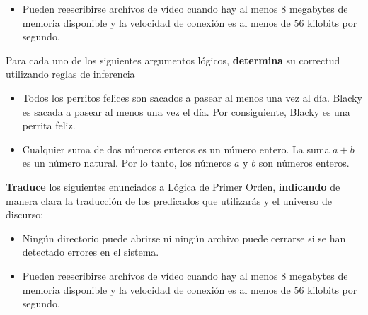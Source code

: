 \documentclass[oneside]{style}
\begin{document}
\begin{questions}[label=\protect\circled{\bfseries\arabic*}]
{\begin{itemize}
            \item Pueden reescribirse archívos de vídeo cuando hay al menos 
            $8$ megabytes de memoria disponible y la velocidad de conexión 
            es al menos de $56$ kilobits por segundo. 
         \end{itemize}
     }

    \question
    {
        Para cada uno de los siguientes argumentos lógicos, \textbf{determina} su 
        correctud utilizando reglas de inferencia 
        \begin{itemize}
            \item Todos los perritos felices son sacados a pasear al menos 
            una vez al día. Blacky es sacada a pasear al menos una vez el día. 
            Por consiguiente, Blacky es una perrita feliz. 

            \item Cualquier suma de dos números enteros es un número 
            entero. La suma $a+b$ es un número natural. Por lo tanto, 
            los números $a$ y $b$ son números enteros. 
        \end{itemize}
    }

    \question
     {
         \textbf{Traduce} los siguientes enunciados a Lógica de Primer Orden, 
         \textbf{indicando} de manera clara la traducción de los predicados 
         que utilizarás y el universo de discurso:
         \begin{itemize}
            \item Ningún directorio puede abrirse ni ningún archivo puede 
            cerrarse si se han detectado errores en el sistema. 

            \item Pueden reescribirse archívos de vídeo cuando hay al menos 
            $8$ megabytes de memoria disponible y la velocidad de conexión 
            es al menos de $56$ kilobits por segundo. 
         \end{itemize}
     }
\end{questions}
\end{document}
